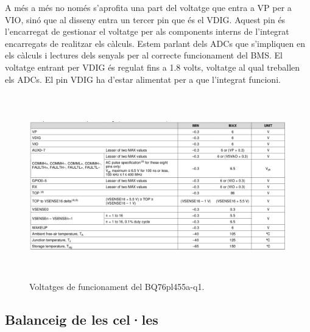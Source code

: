 A més a més no només s'aprofita una part del voltatge que entra a VP per a VIO, sinó que al disseny entra un tercer pin que és el VDIG. Aquest pin és l'encarregat de gestionar el voltatge per als components interns de l'integrat encarregats de realitzar els càlculs. Estem parlant dels ADCs que s'impliquen en els càlculs i lectures dels senyals per al correcte funcionament del BMS. El voltatge entrant per VDIG és regulat fins a 1.8 volts, voltatge al qual treballen els ADCs. El pin VDIG ha d'estar alimentat per a que l'integrat funcioni.

\begin{figure}[H]
	\centering
    \includegraphics[width=\textwidth, height=8cm] {Prototip/nivelesvoltaje.png}
    \caption{Voltatges de funcionament del BQ76pl455a-q1.}
\end{figure}

\subsection{Balanceig de les cel·les}

